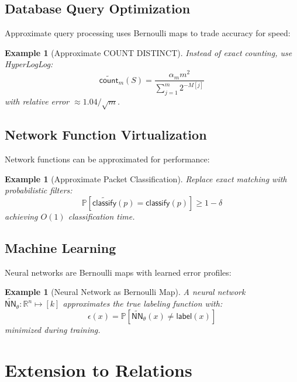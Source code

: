 \documentclass[11pt,final,hidelinks]{article}
\newtheorem{example}[theorem]{Example}
\newcommand{\obs}[1]{\widetilde{#1}}  %
\newcommand{\Fun}[1]{\mathsf{#1}}     %
\newcommand{\AFun}[1]{\obs{\mathsf{#1}}}  %
\newcommand{\Prob}[1]{\mathbb{P}\left[#1\right]}
\newcommand{\error}{\epsilon}
\newcommand{\Real}{\mathbb{R}}
\begin{document}
\subsection{Database Query Optimization}

Approximate query processing uses Bernoulli maps to trade accuracy for speed:

\begin{example}[Approximate COUNT DISTINCT]
Instead of exact counting, use HyperLogLog:
\begin{equation}
\AFun{count}_m(S) = \frac{\alpha_m m^2}{\sum_{j=1}^m 2^{-M[j]}}
\end{equation}
with relative error $\approx 1.04/\sqrt{m}$.
\end{example}

\subsection{Network Function Virtualization}

Network functions can be approximated for performance:

\begin{example}[Approximate Packet Classification]
Replace exact matching with probabilistic filters:
\begin{equation}
\Prob{\AFun{classify}(p) = \Fun{classify}(p)} \geq 1 - \delta
\end{equation}
achieving $O(1)$ classification time.
\end{example}

\subsection{Machine Learning}

Neural networks are Bernoulli maps with learned error profiles:

\begin{example}[Neural Network as Bernoulli Map]
A neural network $\AFun{NN}_\theta : \Real^n \mapsto [k]$ approximates the true labeling function with:
\begin{equation}
\error(x) = \Prob{\AFun{NN}_\theta(x) \neq \Fun{label}(x)}
\end{equation}
minimized during training.
\end{example}

\section{Extension to Relations}
\end{document}
